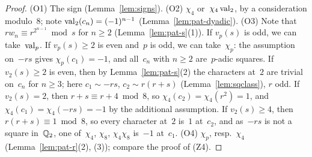 \begin{proof}
  \leanok
  (O1) The sign (Lemma~\ref{lem:signs}). (O2) $\chi_4$ or~$\chi_4 \operatorname{val}_2$, by a consideration
  modulo~$8$; note $\operatorname{val}_2(c_n) = (-1)^{n-1}$ (Lemma~\ref{lem:pat-dyadic}). (O3) Note that
  $r w_n \equiv r^{2^{n-1}} \bmod s$ for $n \ge 2$ (Lemma~\ref{lem:pat-s}(1)). If $v_p(s)$ is odd,
  we can take~$\operatorname{val}_p$. If $v_p(s) \ge 2$ is even and~$p$ is odd, we can take~$\chi_p$: the
  assumption on~$-rs$ gives $\chi_p(c_1) = -1$, and all~$c_n$ with $n \ge 2$ are~$p$-adic squares.
  If $v_2(s) \ge 2$ is even, then by Lemma~\ref{lem:pat-s}(2) the characters at~$2$ are trivial
  on~$c_n$ for $n \ge 3$; here $c_1 \sim -rs$, $c_2 \sim r(r+s)$ (Lemma~\ref{lem:sqclass}), $r$
  odd. If $v_2(s) = 2$, then $r + s \equiv r + 4 \bmod 8$, so $\chi_4(c_2) = \chi_4(r^2) = 1$, and
  $\chi_4(c_1) = \chi_4(-rs) = -1$ by the additional assumption. If $v_2(s) \ge 4$, then
  $r(r + s) \equiv 1 \bmod 8$, so every character at~$2$ is~$1$ at~$c_2$, and as~$-rs$ is not a
  square in~$\mathbb{Q}_2$, one of~$\chi_4$, $\chi_8$, $\chi_4\chi_8$ is~$-1$ at~$c_1$. (O4) $\chi_p$,
  resp.\ $\chi_4$ (Lemma~\ref{lem:pat-r}(2), (3)); compare the proof of (Z4).
\end{proof}

